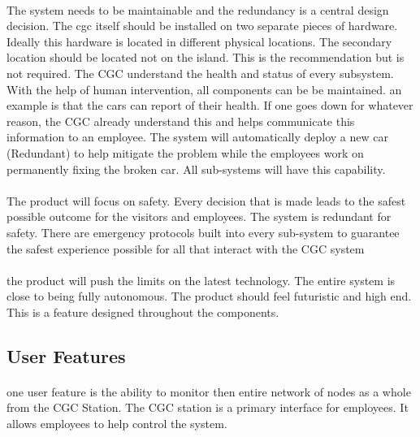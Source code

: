 \documentclass[12pt]{article}
\begin{document}
		\paragraph{} The system needs to be maintainable and the redundancy is a central design decision. The cgc itself should be installed on two separate pieces of hardware. Ideally this hardware is located in different physical locations. The secondary location should be located not on the island. This is the recommendation but is not required.
        The CGC understand the health and status of every subsystem. With the help of human intervention, all components can be be maintained. an example is that the cars can report of their health. If one goes down for whatever reason, the CGC already understand this and helps communicate this information to an employee.  
        The system will automatically deploy a new car (Redundant) to help mitigate the problem while the employees work on permanently fixing the broken car. All sub-systems will have this capability.
	
        \paragraph{} The product will focus on safety. Every decision that is made leads to the safest possible outcome for the visitors and employees. The system is redundant for safety. There are emergency protocols built into every sub-system to guarantee the safest experience possible for all that interact with the CGC system 
        
		\paragraph{} the product will push the limits on the latest technology. The entire system is close to being fully autonomous. The product should feel futuristic and high end. This is a feature designed throughout the components.

	\subsection{User Features}
		\paragraph{}  one user feature is the ability to monitor then entire network of nodes as a whole from the CGC Station. The CGC station is a primary interface for employees. It allows employees to help control the system.
		
\end{document}
